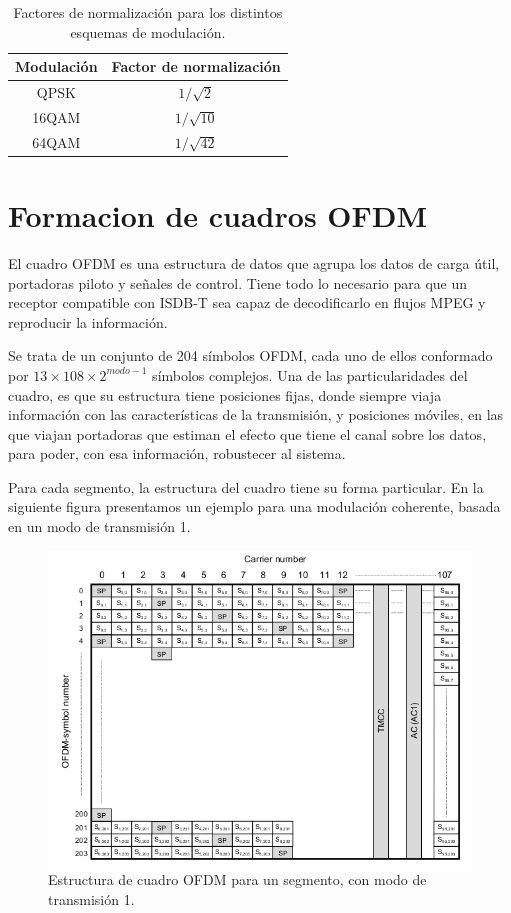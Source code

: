 \begin{table}[h!]
\centering
\begin{tabular}{|c|c|}
\hline
\textbf{Modulaci\'on} 				& \textbf{Factor de normalizaci\'on}\\
\hline
QPSK 		& $1/ \sqrt{2}$\\
\hline
16QAM		& $1/ \sqrt{10}$ \\
\hline
64QAM 		& $1/ \sqrt{42}$ \\
\hline
\end{tabular}
\caption{\label{t:factor_normalizacion} Factores de normalizaci\'on para los distintos esquemas de modulaci\'on.}
\end{table}


\section{Formacion de cuadros OFDM}
El cuadro OFDM es una estructura de datos que agrupa los datos de carga \'util, portadoras piloto y señales de control. Tiene todo lo necesario para que un receptor compatible con ISDB-T sea capaz de decodificarlo en flujos MPEG y reproducir la informaci\'on.

Se trata de un conjunto de 204 s\'imbolos OFDM, cada uno de ellos conformado por $13 \times 108 \times 2^{modo -1}$ s\'imbolos complejos. Una de las particularidades del cuadro, es que su estructura tiene posiciones fijas, donde siempre viaja información con las características de la transmisión, y posiciones móviles, en las que viajan portadoras que estiman el efecto que tiene el canal sobre los datos, para poder, con esa información, robustecer al sistema. 

Para cada segmento, la estructura del cuadro tiene su forma particular. En la siguiente figura presentamos un ejemplo para una modulación coherente, basada en un modo de transmisión 1.

\begin{figure}[!h]
	\centering
	\includegraphics[scale=0.5]{figuras/cap05/ofdm_frame}
	\caption{\label{f:ofdm_frame} Estructura de cuadro OFDM para un segmento, con modo de transmisión 1.}
\end{figure}

